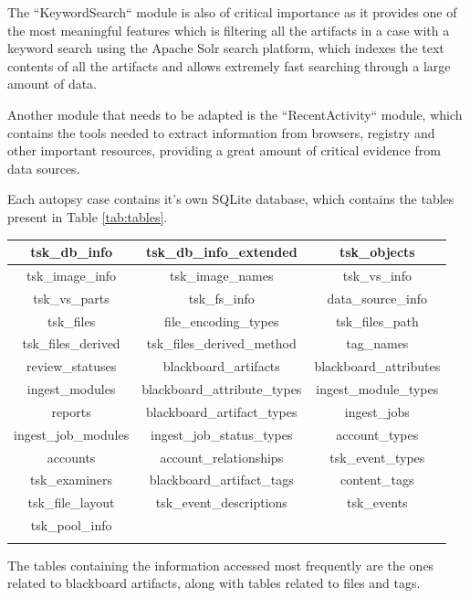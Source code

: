 The ``KeywordSearch`` module is also of critical importance as it provides one of the most meaningful features which is filtering all the artifacts in a case with a keyword
search using the Apache Solr \cite{solr} search platform, which indexes the text contents of all the artifacts and allows extremely fast searching through a large amount of data.  

Another module that needs to be adapted is the ``RecentActivity`` module, which contains the tools needed to extract information from browsers, registry and other important resources, providing a great amount of
critical evidence from data sources.

Each autopsy case contains it's own SQLite \cite{sqlite} database, which contains the tables present in Table \ref{tab:tables}.

\begin{tabularx}{\textwidth}{|c|c|c|}
    \hline
    tsk\_db\_info & tsk\_db\_info\_extended & tsk\_objects \\
    \hline
    tsk\_image\_info & tsk\_image\_names & tsk\_vs\_info \\
    \hline
    tsk\_vs\_parts & tsk\_fs\_info & data\_source\_info \\
    \hline
    tsk\_files & file\_encoding\_types & tsk\_files\_path \\
    \hline
    tsk\_files\_derived & tsk\_files\_derived\_method & tag\_names \\
    \hline
    review\_statuses & blackboard\_artifacts & blackboard\_attributes \\
    \hline
    ingest\_modules & blackboard\_attribute\_types & ingest\_module\_types \\
    \hline
    reports & blackboard\_artifact\_types & ingest\_jobs \\
    \hline
    ingest\_job\_modules & ingest\_job\_status\_types & account\_types \\
    \hline
    accounts & account\_relationships & tsk\_event\_types \\
    \hline
    tsk\_examiners & blackboard\_artifact\_tags & content\_tags \\
    \hline
    tsk\_file\_layout & tsk\_event\_descriptions & tsk\_events \\
    \hline
    tsk\_pool\_info & & \\
    \hline
    \caption{Case Database Tables}
    \label{tab:tables}
\end{tabularx}

The tables containing the information accessed most frequently are the ones related to blackboard artifacts, along with tables related to files and tags.

